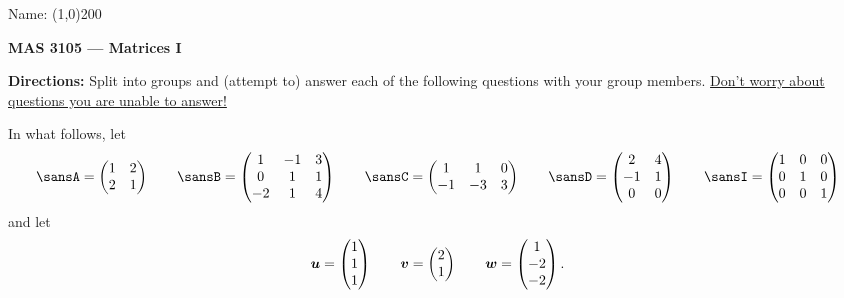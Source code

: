 \documentclass[12 pt]{article}
\newcommand{\pmat}[1]{\begin{pmatrix}#1\end{pmatrix}}
\begin{document}
\begin{flushright}Name: \line(1,0){200}\end{flushright}
\begin{center}
\Large{\textbf{MAS 3105 --- Matrices I}}
\end{center}
\textbf{Directions:} Split into groups and (attempt to) answer each of the following questions with your group members. \ul{Don't worry about questions you are unable to answer!}

\vspace{0.25in}

\noindent In what follows, let
\[\sansA=\pmat{1 & 2 \\ 2 & 1}\quad\quad\sansB=\pmat{1 & -1 & 3\\0 & 1 & 1\\-2 & 1 & 4}\quad\quad\sansC=\pmat{1 & 1 & 0 \\ -1 & -3 & 3}\quad\quad\sansD=\pmat{2 & 4 \\ -1 & 1\\0 & 0}\quad\quad\sansI=\pmat{1 & 0 & 0 \\ 0 & 1 & 0 \\ 0 & 0 & 1}\]
and let
\[\vect{u}=\pmat{1\\1\\1}\quad\quad\vect{v}=\pmat{2\\1}\quad\quad\vect{w}=\pmat{1\\-2\\-2}.\]
\end{document}

